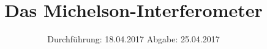 

\subject{V401}
\title{Das Michelson-Interferometer}
\date{
\centering
  Durchführung: 18.04.2017
  \hspace{3em}
  Abgabe: 25.04.2017
}



\maketitle
\thispagestyle{empty}
\tableofcontents
\newpage








\printbibliography


